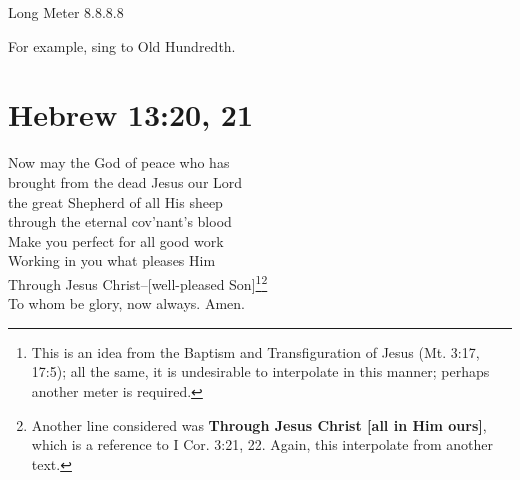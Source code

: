\documentclass{article}
\begin{document}
\noindent Long Meter 8.8.8.8

\noindent For example, sing to Old Hundredth.

\section*{Hebrew 13:20, 21}

 Now may the God of peace who has\\
brought from the dead Jesus our Lord\\
the great Shepherd of all His sheep\\
through the eternal cov'nant's blood\\

 Make you perfect for all good work\\
Working in you what pleases Him\\
Through Jesus Christ--[well-pleased Son]\footnote{This is an idea from the Baptism and Transfiguration of Jesus (Mt. 3:17, 17:5); all the same, it is undesirable to interpolate in this manner; perhaps another meter is required.}\footnote{Another line considered was \textbf{Through Jesus Christ [all in Him ours]}, which is a reference to I Cor. 3:21, 22. Again, this interpolate from another text.}\\
To whom be glory, now always. Amen.
\end{document}
